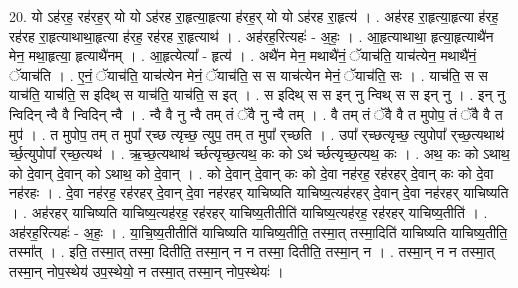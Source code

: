 \documentclass[17pt]{extarticle}
\begin{document}
20. यो ऽह॑रह॒ रह॑रह॒र् यो यो ऽह॑रह रा॒हृत्या॒हृत्या ह॑रह॒र् यो यो ऽह॑रह रा॒हृत्य॑ । . अह॑रह रा॒हृत्या॒हृत्या ह॑रह॒ रह॑रह रा॒हृत्याथाथा॒हृत्या ह॑रह॒ रह॑रह रा॒हृत्याथ॑ । . अह॑रह॒रित्यहः॑ - अ॒हः॒ । . आ॒हृत्याथाथा॒ हृत्या॒हृत्याथै॑न मेन॒ मथा॒हृत्या॒ हृत्याथै॑नम् । . आ॒हृत्येत्या᳚ - हृत्य॑ । . अथै॑न मेन॒ मथाथै॑नं॒ ॅयाच॑ति॒ याच॑त्येन॒ मथाथै॑नं॒ ॅयाच॑ति । . ए॒नं॒ ॅयाच॑ति॒ याच॑त्येन मेनं॒ ॅयाच॑ति॒ स स याच॑त्येन मेनं॒ ॅयाच॑ति॒ सः । . याच॑ति॒ स स याच॑ति॒ याच॑ति॒ स इदिथ् स याच॑ति॒ याच॑ति॒ स इत् । . स इदिथ् स स इन् नु न्विथ् स स इन् नु । . इन् नु न्विदिन् न्वै वै न्विदिन् न्वै । . न्वै वै नु न्वै तम् तं ॅवै नु न्वै तम् । . वै तम् तं ॅवै वै त मुपोप॒ तं ॅवै वै त मुप॑ । . त मुपोप॒ तम् त मुपा᳚ र्‌च्छ त्यृच्छ॒ त्युप॒ तम् त मुपा᳚ र्‌च्छति । . उपा᳚ र्‌च्छत्यृच्छ॒ त्युपोपा᳚ र्‌च्छ॒त्यथाथ॑ र्च्छ॒त्युपोपा᳚ र्‌च्छ॒त्यथ॑ । . ऋ॒च्छ॒त्यथाथ॑ र्च्छत्यृच्छ॒त्यथ॒ कः को ऽथ॑ र्च्छत्यृच्छ॒त्यथ॒ कः । . अथ॒ कः को ऽथाथ॒ को दे॒वान् दे॒वान् को ऽथाथ॒ को दे॒वान् । . को दे॒वान् दे॒वान् कः को दे॒वा नह॑रह॒ रह॑रहर् दे॒वान् कः को दे॒वा नह॑रहः । . दे॒वा नह॑रह॒ रह॑रहर् दे॒वान् दे॒वा नह॑रहर् याचिष्यति याचिष्य॒त्यह॑रहर् दे॒वान् दे॒वा नह॑रहर् याचिष्यति । . अह॑रहर् याचिष्यति याचिष्य॒त्यह॑रह॒ रह॑रहर् याचिष्य॒तीतीति॑ याचिष्य॒त्यह॑रह॒ रह॑रहर् याचिष्य॒तीति॑ । . अह॑रह॒रित्यहः॑ - अ॒हः॒ । . या॒चि॒ष्य॒तीतीति॑ याचिष्यति याचिष्य॒तीति॒ तस्मा॒त् तस्मा॒दिति॑ याचिष्यति याचिष्य॒तीति॒ तस्मा᳚त् । . इति॒ तस्मा॒त् तस्मा॒ दितीति॒ तस्मा॒न् न न तस्मा॒ दितीति॒ तस्मा॒न् न । . तस्मा॒न् न न तस्मा॒त् तस्मा॒न् नोप॒स्थेय॑ उप॒स्थेयो॒ न तस्मा॒त् तस्मा॒न् नोप॒स्थेयः॑ । \newline
\end{document}
